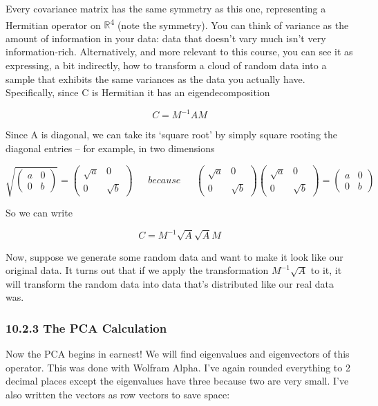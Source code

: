 \documentclass[oneside,english]{amsbook}
\numberwithin{section}{chapter}
\theoremstyle{plain}
\theoremstyle{definition}
\begin{document}
Every covariance matrix has the same symmetry as this one, representing
a Hermitian operator on $\mathbb{R}$\textsuperscript{4} (note the
symmetry). You can think of variance as the amount of information in
your data: data that doesn't vary much isn't very information-rich.
Alternatively, and more relevant to this course, you can see it as
expressing, a bit indirectly, how to transform a cloud of random data
into a sample that exhibits the same variances as the data you actually
have. Specifically, since C is Hermitian it has an eigendecomposition

\[C = M^{- 1}AM\]

Since A is diagonal, we can take its `square root' by simply square
rooting the diagonal entries -- for example, in two dimensions

\[\sqrt{\begin{pmatrix}
		a & 0 \\
		0 & b
\end{pmatrix}} = \begin{pmatrix}
	\sqrt{a} & 0 \\
	0 & \sqrt{b}
\end{pmatrix}\ \ \ \ \ \ \ because\ \ \ \ \ \ \ \begin{pmatrix}
	\sqrt{a} & 0 \\
	0 & \sqrt{b}
\end{pmatrix}\begin{pmatrix}
	\sqrt{a} & 0 \\
	0 & \sqrt{b}
\end{pmatrix} = \begin{pmatrix}
	a & 0 \\
	0 & b
\end{pmatrix}\]

So we can write

\[C = M^{- 1}\sqrt{A}\sqrt{A}M\]

Now, suppose we generate some random data and want to make it look like
our original data. It turns out that if we apply the transformation
\(M^{- 1}\sqrt{A}\) to it, it will transform the random data into data
that's distributed like our real data was.

\subsubsection{10.2.3 The PCA Calculation}\label{the-pca-calculation}

Now the PCA begins in earnest! We will find eigenvalues and eigenvectors
of this operator. This was done with Wolfram Alpha. I've again rounded
everything to 2 decimal places except the eigenvalues have three because
two are very small. I've also written the vectors as row vectors to save
space:
\end{document}
